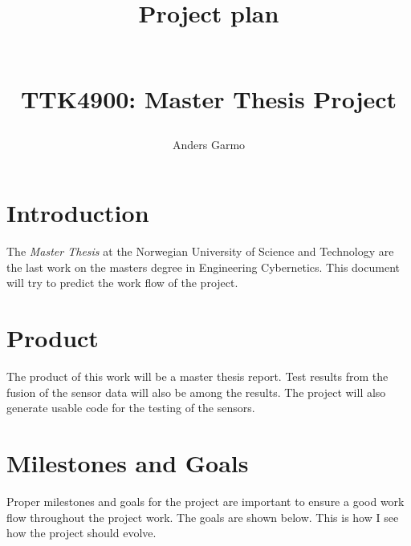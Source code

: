 \documentclass[a4paper, 10pt]{article}
\title{\begin{huge}\textbf{Project plan}\end{huge} \\ TTK4900: Master Thesis Project }
\author{Anders Garmo}
\begin{document}
\maketitle

\newpage

\section{Introduction}
The \emph{Master Thesis} at the Norwegian University of Science and Technology are the
last work on the masters degree in Engineering Cybernetics. This document will try to
predict the work flow of the project. 

\section{Product}
The product of this work will be a master thesis report. Test results from the fusion of
the sensor data will also be among the results. The project will also generate usable code
for the testing of the sensors. 

\section{Milestones and Goals}
Proper milestones and goals for the project are important to ensure a good work flow throughout the
project work. The goals are shown below. This is how I see how the project should evolve. 
\end{document}
